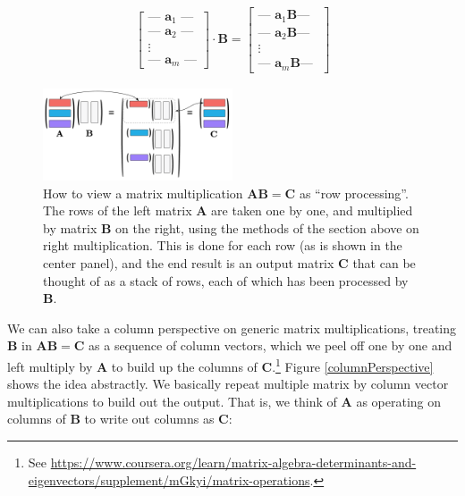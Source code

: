 \begin{align*}
\begin{bmatrix}
\text{--- } \mathbf{a}_1 \text{ ---} \\
\text{--- } \mathbf{a}_2 \text{ ---} \\
\vdots \\
\text{--- } \mathbf{a}_m \text{ ---}
\end{bmatrix}
\cdot
\mathbf{B}
=
\begin{bmatrix}
\text{--- } \mathbf{a}_1 \mathbf{B} \text{--- } \\
\text{--- } \mathbf{a}_2 \mathbf{B} \text{--- } \\
\vdots \\
\text{--- } \mathbf{a}_m \mathbf{B} \text{--- }
\end{bmatrix}
\end{align*}

\begin{figure}[h]
\centering
\includegraphics[width=0.5\textwidth]{images/rowPerspective.png}
\caption[Jeff Yoshimi.]{How to view a matrix multiplication  $\mathbf{A}\mathbf{B} = \mathbf{C}$ as ``row processing''. The rows of the left matrix $\mathbf{A}$ are taken one by one, and multiplied by matrix $\mathbf{B}$  on the right, using the methods of the section above on right multiplication. This is done for each row (as is shown in the center panel), and the end result is an output matrix $\mathbf{C}$ that can be thought of as a stack of rows, each of which has been processed by $\mathbf{B}$.}
\label{rowPerspective}
\end{figure} 

We can also take a column perspective on generic matrix multiplications, treating $\mathbf{B}$ in $\mathbf{A}\mathbf{B} = \mathbf{C}$ as a sequence of column vectors, which we peel off one by one and left multiply by $\mathbf{A}$ to build up the columns of $\mathbf{C}$.\footnote{See \url{https://www.coursera.org/learn/matrix-algebra-determinants-and-eigenvectors/supplement/mGkyi/matrix-operations}.}  Figure \ref{columnPerspective} shows the idea abstractly. We basically repeat multiple matrix by column vector multiplications to build out the output. That is, we think of $\mathbf{A}$ as operating on columns of $\mathbf{B}$ to write out columns as $\mathbf{C}$:

